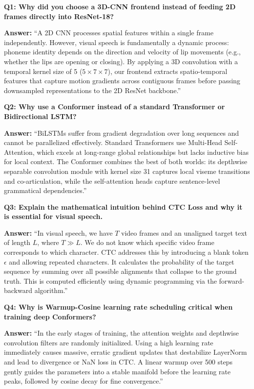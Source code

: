 \documentclass[11pt,a4paper]{article}
\begin{document}
\textbf{Q1: Why did you choose a 3D-CNN frontend instead of feeding 2D frames directly into ResNet-18?}
\begin{tcolorbox}[colback=gray!5!white,colframe=gray!75!black]
\textbf{Answer:} ``A 2D CNN processes spatial features within a single frame independently. However, visual speech is fundamentally a dynamic process: phoneme identity depends on the direction and velocity of lip movements (e.g., whether the lips are opening or closing). By applying a 3D convolution with a temporal kernel size of 5 ($5 \times 7 \times 7$), our frontend extracts spatio-temporal features that capture motion gradients across contiguous frames before passing downsampled representations to the 2D ResNet backbone.''
\end{tcolorbox}

\textbf{Q2: Why use a Conformer instead of a standard Transformer or Bidirectional LSTM?}
\begin{tcolorbox}[colback=gray!5!white,colframe=gray!75!black]
\textbf{Answer:} ``BiLSTMs suffer from gradient degradation over long sequences and cannot be parallelized effectively. Standard Transformers use Multi-Head Self-Attention, which excels at long-range global relationships but lacks inductive bias for local context. The Conformer combines the best of both worlds: its depthwise separable convolution module with kernel size 31 captures local viseme transitions and co-articulation, while the self-attention heads capture sentence-level grammatical dependencies.''
\end{tcolorbox}

\textbf{Q3: Explain the mathematical intuition behind CTC Loss and why it is essential for visual speech.}
\begin{tcolorbox}[colback=gray!5!white,colframe=gray!75!black]
\textbf{Answer:} ``In visual speech, we have $T$ video frames and an unaligned target text of length $L$, where $T \gg L$. We do not know which specific video frame corresponds to which character. CTC addresses this by introducing a blank token $\epsilon$ and allowing repeated characters. It calculates the probability of the target sequence by summing over all possible alignments that collapse to the ground truth. This is computed efficiently using dynamic programming via the forward-backward algorithm.''
\end{tcolorbox}

\textbf{Q4: Why is Warmup-Cosine learning rate scheduling critical when training deep Conformers?}
\begin{tcolorbox}[colback=gray!5!white,colframe=gray!75!black]
\textbf{Answer:} ``In the early stages of training, the attention weights and depthwise convolution filters are randomly initialized. Using a high learning rate immediately causes massive, erratic gradient updates that destabilize LayerNorm and lead to divergence or NaN loss in CTC. A linear warmup over 500 steps gently guides the parameters into a stable manifold before the learning rate peaks, followed by cosine decay for fine convergence.''
\end{tcolorbox}
\end{document}
